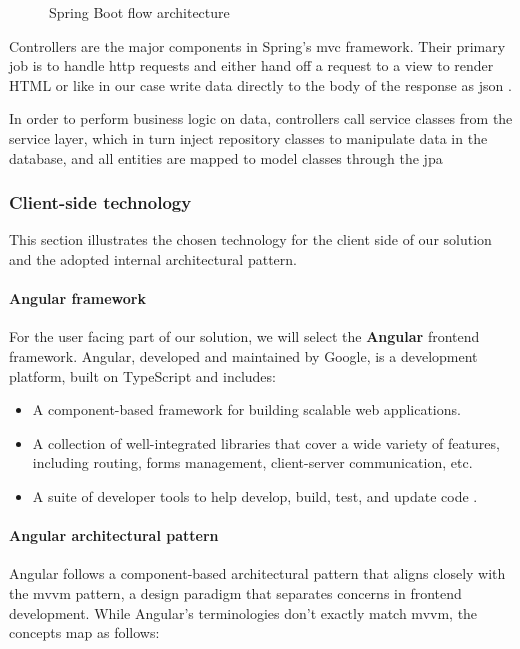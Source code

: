 \begin{figure}[hbt!]
      \centering
      
      \caption{Spring Boot flow architecture}
      \label{flow}
\end{figure}

Controllers are the major components in Spring’s \acrshort{mvc} framework. Their primary job is to handle
\acrshort{http} requests and either hand off a request to a view to render HTML or like in our case
write data directly to the body of the response as \acrshort{json} \cite{spring-in-action}.

In order to perform business logic on data, controllers call service classes from the service layer,
which in turn inject repository classes to manipulate data in the database, and all entities are mapped
to model classes through the \acrfull{jpa}


\subsubsection{Client-side technology}
\label{cst}
This section illustrates the chosen technology for the client side of our solution and the adopted
internal architectural pattern.

\paragraph{Angular framework} \mbox{} \newline \newline
For the user facing part of our solution, we will select the \textbf{Angular} frontend framework.
Angular, developed and maintained by Google, is a development platform, built on TypeScript and
includes:
\begin{itemize}
      \item A component-based framework for building scalable web applications.
      \item A collection of well-integrated libraries that cover a wide variety of features,
            including routing, forms management, client-server communication, etc.
      \item A suite of developer tools to help develop, build, test, and update code \cite{angular}. \\
\end{itemize}


\paragraph{Angular architectural pattern} \mbox{} \newline \newline
Angular follows a component-based architectural pattern that aligns closely with the
\acrfull{mvvm} pattern, a design paradigm that separates concerns in frontend
development. While Angular's terminologies don't exactly match \acrshort{mvvm},
the concepts map as follows: \\

